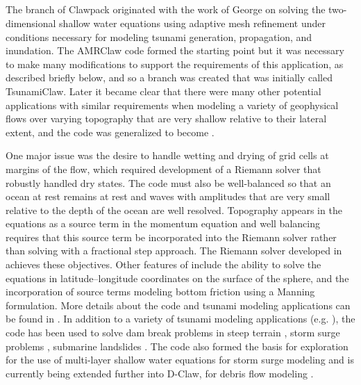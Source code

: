 %
%
%

\subsection{\geoclaw} 


The \geoclaw branch of Clawpack originated with the work of George
\cite{dgeorge:masters, dgeorge:phd, dgeorge:jcp} on solving the
two-dimensional shallow water equations using adaptive mesh refinement under
conditions necessary for modeling tsunami generation, propagation, and
inundation.
The AMRClaw code formed the starting point but it was necessary to make many 
modifications to support the requirements of this application, as described
briefly below, and so a branch was created that was initially called
TsunamiClaw.  Later it became clear that there were many other potential
applications with similar requirements when modeling a variety of
geophysical flows over varying topography that are very shallow 
relative to their lateral extent,
and the code was generalized to become \geoclaw.  

One major issue was the desire to handle wetting and drying of grid cells at
margins of the flow, which required development of a Riemann solver that
robustly handled dry states.  The code must also be well-balanced so that an
ocean at rest remains at rest and waves with amplitudes that are very small
relative to the depth of the ocean are well resolved.  Topography appears in
the equations as a source term in the momentum equation and well balancing
requires that this source term be incorporated into the Riemann solver
rather than solving with a fractional step approach.  The Riemann solver
developed in \cite{dgeorge:phd, dgeorge:jcp} achieves these objectives.
Other features of \geoclaw include the ability to solve the equations in
latitude--longitude coordinates on the surface of the sphere, and the
incorporation of source terms modeling bottom friction using a Manning
formulation.
More details about the code and tsunami modeling applications can be found
in \cite{BergerGeorgeLeVequeMandli:awr11, LeVequeGeorgeBerger:an11}. 
In addition to a variety of tsunami modeling applications (e.g. \cite{??}),
the \geoclaw code has been used to solve dam break problems in steep terrain
\cite{George:Malpasset}, storm surge problems \cite{??},
submarine landslides \cite{??}.  The code also
formed the basis for exploration for the use of 
multi-layer shallow water equations for storm surge modeling
\cite{mandli:phd, ??} and is currently being extended further into D-Claw,
for debris flow modeling \cite{??}.

